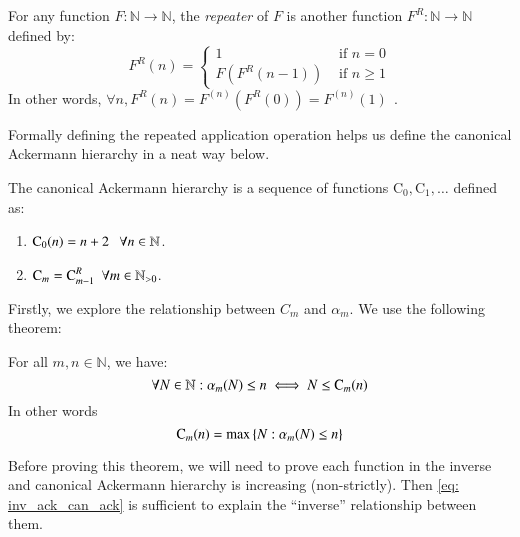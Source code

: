 \begin{defn} \label{defn: rep_app}
For any function $F: \mathbb{N} \to \mathbb{N}$, the 
\textit{repeater} of $F$ is another function $F^R : 
\mathbb{N} \to \mathbb{N}$ defined by:
\begin{equation}
F^R(n) = \begin{cases}
1 & \text{ if } n = 0 \\ F\left(F^R(n - 1)\right) & \text{ if } n \ge 1
\end{cases}
\end{equation}
In other words, $\forall n, F^R(n) = F^{(n)}\left(F^R(0)\right) = F^{(n)}(1) \ \ $.
\end{defn}

Formally defining the repeated application operation 
helps us define the canonical Ackermann hierarchy in 
a neat way below.

\begin{defn} \label{defn: can_ack_hier}
The canonical Ackermann hierarchy is a sequence of 
functions $\text{C}_0, \text{C}_1, \ldots $ defined as:
\begin{enumerate}
	\item $\text{C}_0(n) = n + 2 \ \ \ \forall n\in \mathbb{N}$.
	\item $\text{C}_m = \text{C}_{m-1}^R \ \ \forall m\in \mathbb{N}_{>0}$.
\end{enumerate}
\end{defn}

Firstly, we explore the relationship between $C_m$ and 
$\alpha_m$. We use the following theorem:

\begin{thm} \label{thm: inv_ack_can_ack}
For all $m, n \in \mathbb{N}$, we have:
\begin{equation} \label{eq: inv_ack_can_ack}
\forall N \in \mathbb{N}: \alpha_m(N) \le n \iff N \le \text{C}_m(n)
\end{equation}
In other words
\begin{equation} \label{eq: inv_ack_can_ack_0}
\text{C}_m(n) = \max\left\{N : \alpha_m(N) \le n\right\}
\end{equation}
\end{thm}

Before proving this theorem, we will need to prove each 
function in the inverse and canonical Ackermann hierarchy 
is increasing (non-strictly). Then \eqref{eq: inv_ack_can_ack} 
is sufficient to explain the ``inverse'' relationship between them.

%
%
%
%

